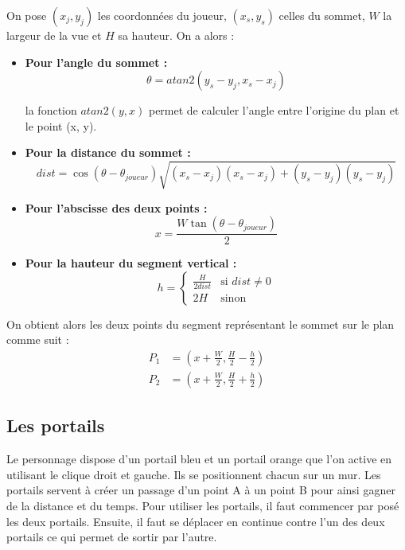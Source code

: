 \documentclass[11pt]{article}
\begin{document}
On pose $(x_j, y_j)$ les coordonnées du joueur,  $(x_s, y_s)$ celles du sommet, $W$ la largeur de la
vue et $H$ sa hauteur. On a alors : \\
\begin{itemize}
	\item[] \textbf{Pour l'angle du sommet : } \\
	\[
		\theta = atan2(y_s - y_j, x_s - x_j)
	\]

	la fonction $atan2(y, x)$ permet de calculer l'angle entre l'origine du plan et le point (x, y).

	\item[] \textbf{Pour la distance du sommet : } \\
	\[
		dist = \cos(\theta - \theta_{joueur})\sqrt{(x_s - x_j)(x_s - x_j) + (y_s - y_j)(y_s - y_j)}
	\]
	
	\item[] \textbf{Pour l'abscisse des deux points : } \\
	\[
		x = \frac{W\tan(\theta -  \theta_{joueur})}{2}
	\]

	\item[] \textbf{Pour la hauteur du segment vertical : } \\ 
	\[
		h = 
		\begin{cases}
			\frac{H}{2dist} & \text{si } dist \neq 0 \\
			2H & \text{sinon }
		\end{cases}
	\]
\end{itemize}

On obtient alors les deux points du segment représentant le sommet sur le plan comme suit :
\begin{align*}
    P_1 &= (x + \frac{W}{2}, \frac{H}{2} - \frac{h}{2}) \\
	P_2 &= (x + \frac{W}{2}, \frac{H}{2} + \frac{h}{2})
\end{align*}


\subsection{Les portails}

Le personnage dispose d’un portail bleu et un portail orange que l’on active en utilisant le clique droit et gauche. Ils se positionnent chacun sur un mur. Les portails servent à créer un passage d’un point A à un point B pour ainsi gagner de la distance et du temps.
Pour utiliser les portails, il faut commencer par posé les deux portails. Ensuite, il faut se déplacer en continue contre l’un des deux portails ce qui permet de sortir par l’autre.
\end{document}
